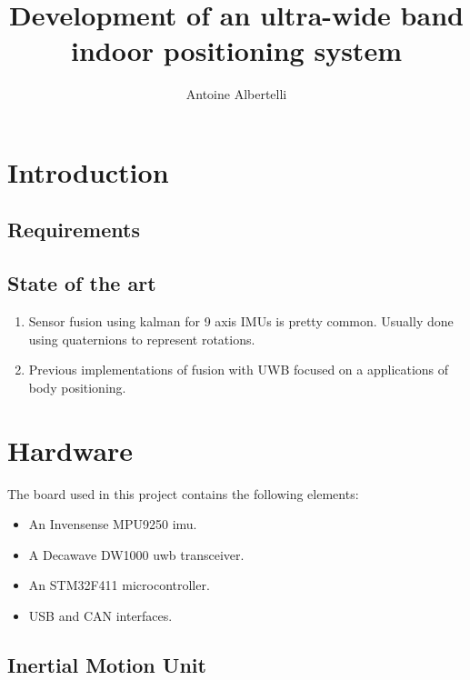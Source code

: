 \documentclass[a4paper]{scrreprt}
\title{Development of an ultra-wide band indoor positioning system}
\author{Antoine Albertelli}
\begin{document}

\maketitle

\tableofcontents

\chapter{Introduction}

\section{Requirements}

\section{State of the art}

\begin{enumerate}
    \item Sensor fusion using kalman for 9 axis IMUs is pretty common.
        Usually done using quaternions to represent rotations.
    \item Previous implementations of fusion with UWB focused on a applications of body positioning.
\end{enumerate}

\chapter{Hardware}

The board used in this project contains the following elements:

\begin{itemize}
    \item An Invensense MPU9250 \gls{imu}.
    \item A Decawave DW1000 \gls{uwb} transceiver.
    \item An STM32F411 microcontroller.
    \item USB and CAN interfaces.
\end{itemize}

\section{Inertial Motion Unit}
\end{document}
